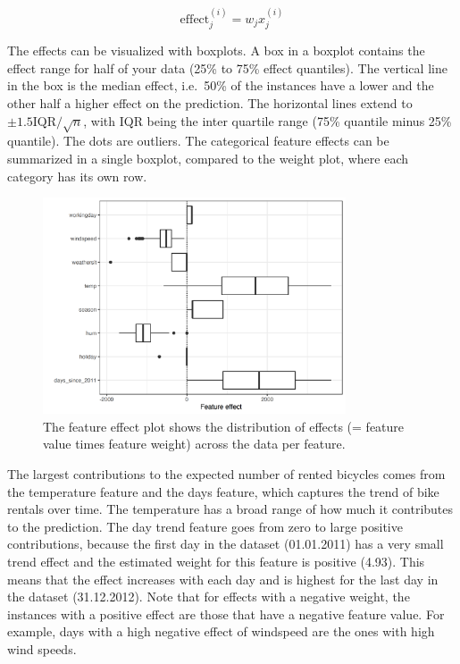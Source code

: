 \documentclass[
  10pt,
]{scrbook}
\begin{document}
\[\text{effect}_{j}^{(i)}=w_{j}x_{j}^{(i)}\]

The effects can be visualized with boxplots.
A box in a boxplot contains the effect range for half of your data (25\% to 75\% effect quantiles).
The vertical line in the box is the median effect, i.e.~50\% of the instances have a lower and the other half a higher effect on the prediction.
The horizontal lines extend to \(\pm1.5\text{IQR}/\sqrt{n}\), with IQR being the inter quartile range (75\% quantile minus 25\% quantile).
The dots are outliers.
The categorical feature effects can be summarized in a single boxplot, compared to the weight plot, where each category has its own row.

\begin{figure}

{\centering \includegraphics[width=0.8\textwidth]{images/linear-effects-1} 

}

\caption{The feature effect plot shows the distribution of effects (= feature value times feature weight) across the data per feature.}\label{fig:linear-effects}
\end{figure}

The largest contributions to the expected number of rented bicycles comes from the temperature feature and the days feature, which captures the trend of bike rentals over time.
The temperature has a broad range of how much it contributes to the prediction.
The day trend feature goes from zero to large positive contributions, because the first day in the dataset (01.01.2011) has a very small trend effect and the estimated weight for this feature is positive (4.93).
This means that the effect increases with each day and is highest for the last day in the dataset (31.12.2012).
Note that for effects with a negative weight, the instances with a positive effect are those that have a negative feature value.
For example, days with a high negative effect of windspeed are the ones with high wind speeds.
\end{document}
